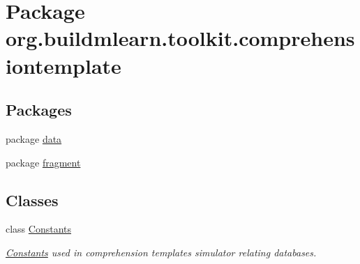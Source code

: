 \hypertarget{namespaceorg_1_1buildmlearn_1_1toolkit_1_1comprehensiontemplate}{}\section{Package org.\+buildmlearn.\+toolkit.\+comprehensiontemplate}
\label{namespaceorg_1_1buildmlearn_1_1toolkit_1_1comprehensiontemplate}
\subsection*{Packages}
\begin{DoxyCompactItemize}
\item 
package \hyperlink{namespaceorg_1_1buildmlearn_1_1toolkit_1_1comprehensiontemplate_1_1data}{data}
\item 
package \hyperlink{namespaceorg_1_1buildmlearn_1_1toolkit_1_1comprehensiontemplate_1_1fragment}{fragment}
\end{DoxyCompactItemize}
\subsection*{Classes}
\begin{DoxyCompactItemize}
\item 
class \hyperlink{classorg_1_1buildmlearn_1_1toolkit_1_1comprehensiontemplate_1_1Constants}{Constants}
\begin{DoxyCompactList}\small\item\em \hyperlink{classorg_1_1buildmlearn_1_1toolkit_1_1comprehensiontemplate_1_1Constants}{Constants} used in comprehension template\textquotesingle{}s simulator relating databases. \end{DoxyCompactList}\end{DoxyCompactItemize}
